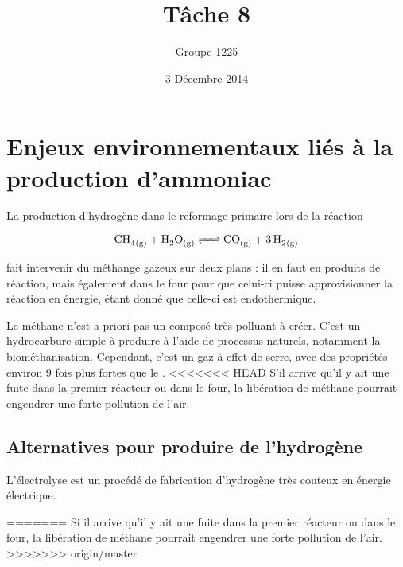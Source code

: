 \documentclass[a4paper, oneside, 12pt]{article}
\title{Tâche 8}
\author{Groupe 1225}
\date{3 Décembre 2014}
\begin{document}
\maketitle

\section*{Enjeux environnementaux liés à la production d'ammoniac}

La production d'hydrogène dans le reformage primaire lors de la réaction

\begin{equation*}
	\ce{CH4_{(g)} + H2O_{(g)} <=> CO_{(g)} + 3 \, H2_{(g)}} 
\end{equation*}

fait intervenir du méthange gazeux sur deux plans : il en faut en produits de réaction, 
mais également dans le four pour que celui-ci puisse approvisionner la réaction en énergie, étant donné que celle-ci est endothermique. 

Le méthane n'est a priori pas un composé très polluant à créer. C'est un hydrocarbure simple à produire à l'aide de processus naturels, notamment la biométhanisation. 
Cependant, c'est un gaz à effet de serre, avec des propriétés environ 9 fois plus fortes que le . 
<<<<<<< HEAD
S'il arrive qu'il y ait une fuite dans la premier réacteur ou dans le four, la libération de méthane pourrait engendrer une forte pollution de l'air.

\subsection{Alternatives pour produire de l'hydrogène}

L'électrolyse est un procédé de fabrication d'hydrogène très couteux en énergie électrique. 


=======
Si il arrive qu'il y ait une fuite dans la premier réacteur ou dans le four, la libération de méthane pourrait engendrer une forte pollution de l'air.\cite{electrolyse}
>>>>>>> origin/master

\printbibliography
\end{document}
